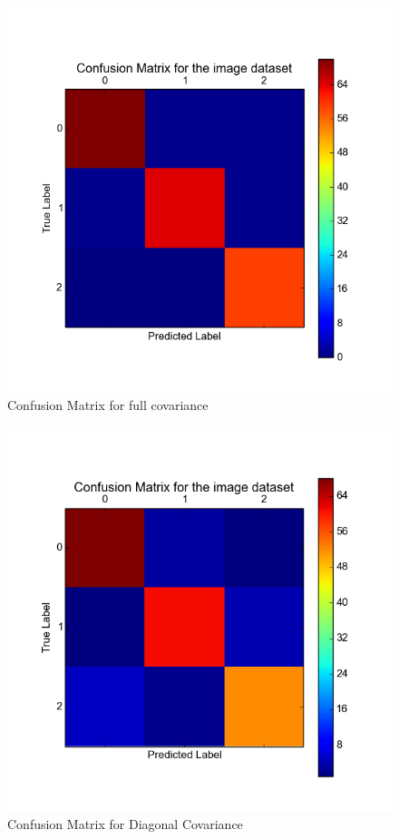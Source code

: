 \documentclass[11pt,a4paper]{article}
\begin{document}
\begin{minipage}[b]{0.5\textwidth}
\begin{figure}[H]
  \centering
  \includegraphics[width=.8\linewidth]{Figures/gmm_images_confusion.png}
  \caption{Confusion Matrix for full covariance}
  \label{fig:sfig1}
\end{figure}%
\end{minipage}
\begin{minipage}[b]{0.5\textwidth}
\begin{figure}[H]
  \centering
  \includegraphics[width=.8\linewidth]{Figures/confusion_diag.png}
\caption{Confusion Matrix for Diagonal Covariance}
  \label{fig:sfig1}
\end{figure}%
\end{minipage}
\end{document}

